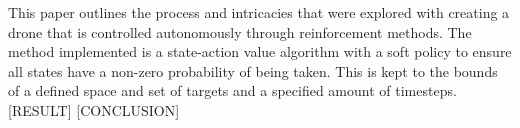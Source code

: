 This paper outlines the process and intricacies that were explored with creating a drone that is controlled autonomously through reinforcement methods. The method implemented is a state-action value algorithm with a soft policy\cite{ARXIVEXAMPLE} to ensure all states have a non-zero probability of being taken. This is kept to the bounds of a defined space and set of targets and a specified amount of timesteps. [RESULT] [CONCLUSION]